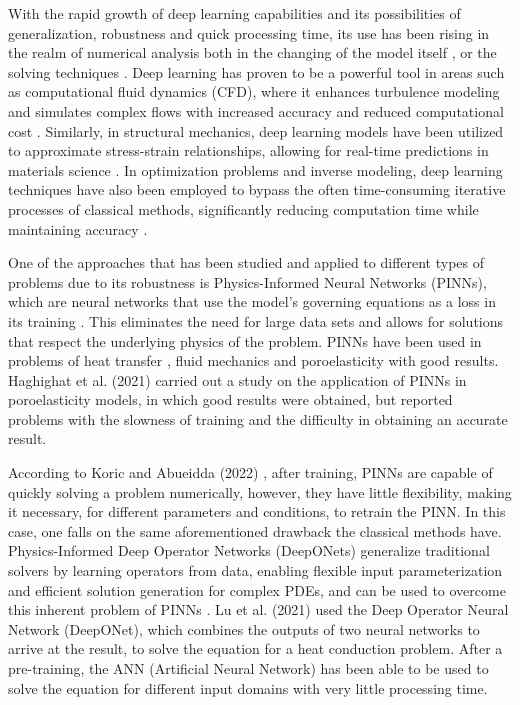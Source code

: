\documentclass[sn-mathphys]{sn-jnl}%
\theoremstyle{thmstyleone}%
\theoremstyle{thmstyletwo}%
\theoremstyle{thmstylethree}%
\begin{document}
With the rapid growth of deep learning capabilities and its possibilities of generalization, robustness and quick processing time, its use has been rising in the realm of numerical analysis both in the changing of the model itself \cite{dehghani2021ann}, or the solving techniques \cite{herrmann2024deep,Firoozsalari2024}. Deep learning has proven to be a powerful tool in areas such as computational fluid dynamics (CFD), where it enhances turbulence modeling and simulates complex flows with increased accuracy and reduced computational cost \cite{Brunton2020,STEPANOV2023114980}. Similarly, in structural mechanics, deep learning models have been utilized to approximate stress-strain relationships, allowing for real-time predictions in materials science \cite{ZHU201956}. In optimization problems and inverse modeling, deep learning techniques have also been employed to bypass the often time-consuming iterative processes of classical methods, significantly reducing computation time while maintaining accuracy \cite{10255379}. 

One of the approaches that has been studied and applied to different types of problems due to its robustness is Physics-Informed Neural Networks (PINNs), which are neural networks that use the model's governing equations as a loss in its training \cite{bai2023physics}. This eliminates the need for large data sets and allows for solutions that respect the underlying physics of the problem.  PINNs have been used in problems of heat transfer \cite{10.1115/1.4050542}, fluid mechanics \cite{Cai2021} and poroelasticity \citep{haghighat2022physics} with good results. Haghighat et al. (2021) \citep{haghighat2022physics} carried out a study on the application of PINNs in poroelasticity models, in which good results were obtained, but reported problems with the slowness of training and the difficulty in obtaining an accurate result.

According to Koric and Abueidda (2022) \cite{koric2023data}, after training, PINNs are capable of quickly solving a problem numerically, however, they have little flexibility, making it necessary, for different parameters and conditions, to retrain the PINN. In this case, one falls on the same aforementioned drawback the classical methods have. Physics-Informed Deep Operator Networks (DeepONets) generalize traditional solvers by learning operators from data, enabling flexible input parameterization and efficient solution generation for complex PDEs, and can be used to overcome this inherent problem of PINNs \cite{lu2019deeponet}. Lu et al. (2021) \cite{lu2019deeponet} used the Deep Operator Neural Network (DeepONet), which combines the outputs of two neural networks to arrive at the result, to solve the equation for a heat conduction problem. After a pre-training, the ANN (Artificial Neural Network) has been able to be used to solve the equation for different input domains with very little processing time.
\end{document}
